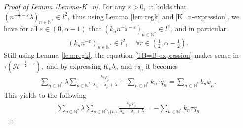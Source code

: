 \documentclass[10pt,a4paper]{amsart}
\begin{document}
\begin{proof}[Proof of Lemma \ref{Lemma-K_n}]
For any $\varepsilon >0,$ it holds that $(n^{-\frac{1}{2}-\varepsilon}\lambda)_{n\in\mathbb{N}^{*}}\in l^2,$ thus using Lemma \ref{lem:regk} and \eqref{K_n-expression}, we have for all $\varepsilon\in (0,\alpha-1)$ that
$(k_n n^{-\frac{1}{2}-\varepsilon})_{n\in \mathbb{N}^*}\in l^2,$ and in particular
\begin{align} 
    (k_n n^{-r})_{n\in \mathbb{N}^*}\in l^2,\quad \forall r\in \left(\frac{1}{2},\alpha-\frac{1}{2}\right).\label{kn-regular0}
\end{align}
Still using Lemma \ref{lem:regk}, the equation \eqref{TB=B-expression} makes sense in $\tau(\mathcal{H}^{-\frac{1}{2}-\varepsilon}),$ and by expressing $K_n b_n$ and $\tau q_n$ it becomes
\begin{align*}
   \sum_{n\in \mathbb{N}^*}\lambda \sum_{p\in \mathbb{N}^*}\frac{b_{p}\varphi_p}{\lambda_n-\lambda_p+\lambda}+ \sum_{n\in \mathbb{N}^*}k_{n}\tau q_{n}= \sum_{n\in \mathbb{N}^*}b_n \varphi_n.
\end{align*}
This yields to the following
\begin{align}
   \sum_{n\in \mathbb{N}^*}\lambda \sum_{p\in \mathbb{N}^*\setminus\{n\}}\frac{b_{p}\varphi_p}{\lambda_n-\lambda_p+\lambda} = -\sum_{n\in \mathbb{N}^*}k_{n}\tau q_{n}\label{sum-regular}
\end{align}


\end{proof}
\end{document}
